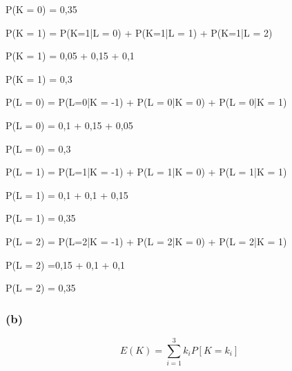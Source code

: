 \documentclass[hidelinks,11pt]{book}
\theoremstyle{definition}
\begin{document}
\begin{center}
	P(K = 0) = 0,35
\end{center}

\begin{center}
	P(K = 1) = P(K=1|L = 0) + P(K=1|L = 1) + P(K=1|L = 2)
\end{center}

\begin{center}
	P(K = 1) = 0,05 + 0,15 + 0,1
\end{center}

\begin{center}
	P(K = 1) = 0,3
\end{center}


\begin{center}
	P(L = 0) = P(L=0|K = -1) + P(L = 0|K = 0) + P(L = 0|K = 1)
\end{center}

\begin{center}
	P(L = 0)  = 0,1 + 0,15 + 0,05
\end{center}

\begin{center}
	P(L = 0) = 0,3
\end{center}

\begin{center}
	P(L = 1) = P(L=1|K = -1) + P(L = 1|K = 0) + P(L = 1|K = 1)
\end{center}

\begin{center}
	P(L = 1)  = 0,1 + 0,1 + 0,15 
\end{center}

\begin{center}
	P(L = 1) = 0,35
\end{center}

\begin{center}
	P(L = 2) = P(L=2|K = -1) + P(L = 2|K = 0) + P(L = 2|K = 1)
\end{center}

\begin{center}
	P(L = 2)  =0,15 + 0,1 + 0,1
\end{center}

\begin{center}
	P(L = 2) = 0,35
\end{center}


\subsubsection{(b)}

\begin{displaymath}
	E(K) = \sum_{i = 1}^{3} k_i P[K = k_i]
\end{displaymath}
\end{document}
